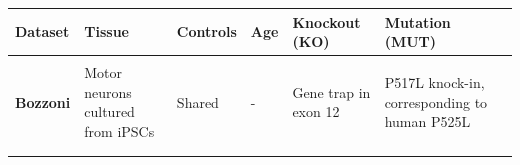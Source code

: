 \begin{longtable}[]{@{}llllll@{}}
	\begin{minipage}[t]{0.14\columnwidth}\raggedright\strut
		{\textbf{Dataset}}\strut
	\end{minipage} & \begin{minipage}[t]{0.14\columnwidth}\raggedright\strut
		{\textbf{Tissue}}\strut
	\end{minipage} & \begin{minipage}[t]{0.12\columnwidth}\raggedright\strut
		{\textbf{Controls}}\strut
	\end{minipage} & \begin{minipage}[t]{0.10\columnwidth}\raggedright\strut
		{\textbf{Age}}\strut
	\end{minipage} & \begin{minipage}[t]{0.14\columnwidth}\raggedright\strut
		{\textbf{Knockout (KO)}}\strut
	\end{minipage} & \begin{minipage}[t]{0.14\columnwidth}\raggedright\strut
		{\textbf{Mutation (MUT)}}\strut
	\end{minipage}\tabularnewline\toprule \\[-0.3cm] 
	\begin{minipage}[t]{0.16\columnwidth}\raggedright\strut
		{\textbf{Bozzoni}}
		{\footnotesize\citep{Capauto2018}}\strut
	\end{minipage} & \begin{minipage}[t]{0.14\columnwidth}\raggedright\strut
		{Motor neurons}
		{cultured from iPSCs}\strut
	\end{minipage} & \begin{minipage}[t]{0.12\columnwidth}\raggedright\strut
		{Shared}\strut
	\end{minipage} & \begin{minipage}[t]{0.10\columnwidth}\raggedright\strut
		{-}\strut
	\end{minipage} & \begin{minipage}[t]{0.16\columnwidth}\raggedright\strut
		{Gene trap in exon 12}	
		{ \footnotesize\citep{Hicks2000} }\strut
	\end{minipage} & \begin{minipage}[t]{0.16\columnwidth}\raggedright\strut
		{P517L knock-in,}
		{corresponding to human P525L}
		{\footnotesize\citep{Chio2009} }\strut
	\end{minipage}\tabularnewline \\
	\begin{minipage}[t]{0.16\columnwidth}\raggedright\strut

\end{minipage}
\end{longtable}
